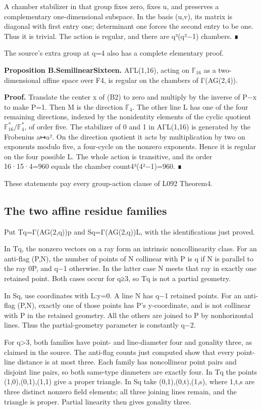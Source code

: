 A chamber stabilizer in that group fixes zero, fixes u, and preserves a
complementary one-dimensional subspace. In the basis (u,v), its matrix
is diagonal with first entry one; determinant one forces the second
entry to be one. Thus it is trivial. The action is regular, and there
are q³(q²−1) chambers. ∎

The source's extra group at q=4 also has a complete elementary proof.

\textbf{Proposition B.SemilinearSixteen.} AΓL(1,16), acting on \(\mathbb F_{16}\) as a
two-dimensional affine space over F4, is regular on the chambers of
Γ(AG(2,4)).

\textbf{Proof.} Translate the center x of (B2) to zero and multiply by
the inverse of P−x to make P=1. Then M is the direction \(\mathbb F_4\). The other
line L has one of the four remaining directions, indexed by the
nonidentity elements of the cyclic quotient \(\mathbb F_{16}^{*}/\mathbb F_4^{*}\), of order
five. The stabilizer of 0 and 1 in AΓL(1,16) is generated by the
Frobenius a↦a². On the direction quotient it acts by multiplication by
two on exponents modulo five, a four-cycle on the nonzero exponents.
Hence it is regular on the four possible L. The whole action is
transitive, and its order 16·15·4=960 equals the chamber
count4³(4²−1)=960. ∎

These statements pay every group-action clause of L092 Theorem4.

\subsection{The two affine residue
families}\label{the-two-affine-residue-families}

Put Tq=Γ(AG(2,q))p and Sq=Γ(AG(2,q))L, with the identifications just
proved.

In Tq, the nonzero vectors on a ray form an intrinsic noncollinearity
class. For an anti-flag (P,N), the number of points of N collinear with
P is q if N is parallel to the ray 0P, and q−1 otherwise. In the latter
case N meets that ray in exactly one retained point. Both cases occur
for q≥3, so Tq is not a partial geometry.

In Sq, use coordinates with L:y=0. A line N has q−1 retained points. For
an anti-flag (P,N), exactly one of those points has P's y-coordinate,
and is not collinear with P in the retained geometry. All the others are
joined to P by nonhorizontal lines. Thus the partial-geometry parameter
is constantly q−2.

For q\textgreater3, both families have point- and line-diameter four and
gonality three, as claimed in the source. The anti-flag counts just
computed show that every point-line distance is at most three. Each
family has noncollinear point pairs and disjoint line pairs, so both
same-type diameters are exactly four. In Tq the points (1,0),(0,1),(1,1)
give a proper triangle. In Sq take (0,1),(0,t),(1,s), where 1,t,s are
three distinct nonzero field elements; all three joining lines remain,
and the triangle is proper. Partial linearity then gives gonality three.

